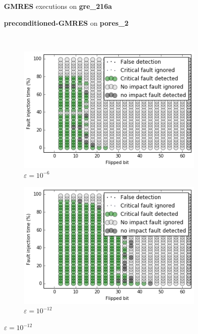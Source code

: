 \begin{figure}[h]
	\centering
    
\begin{minipage}[b]{0.45\linewidth}
\centering
\textbf{GMRES} executions on \textbf{gre_216a} 
\end{minipage}
\quad
\begin{minipage}{0.45\linewidth}
\centering
\textbf{preconditioned-GMRES} on \textbf{pores_2}
\end{minipage}\\


    \begin{minipage}[b]{0.48\linewidth}
	
	\begin{subfigure}[t]{\linewidth}
		\centering
		\includegraphics[width=1.1\linewidth]{figures/gre_216a/test_result_c05_oracle_0.png}
		\caption{$\varepsilon = 10^{-6}$}\label{fig:gre_216a_test_result_c05_oracle_0}	
	\end{subfigure}
    \quad
    \begin{subfigure}[t]{\linewidth}
		\centering
		\includegraphics[width=1.1\linewidth]{figures/gre_216a/test_result_c05_oracle_1.png}
		\caption{$\varepsilon = 10^{-12}$}\label{fig:gre_216a_test_result_c05_oracle_1}	
	\end{subfigure}
    \end{minipage}
    \quad
    \begin{minipage}[b]{0.48\linewidth}
    	

\end{minipage}
\end{figure}
